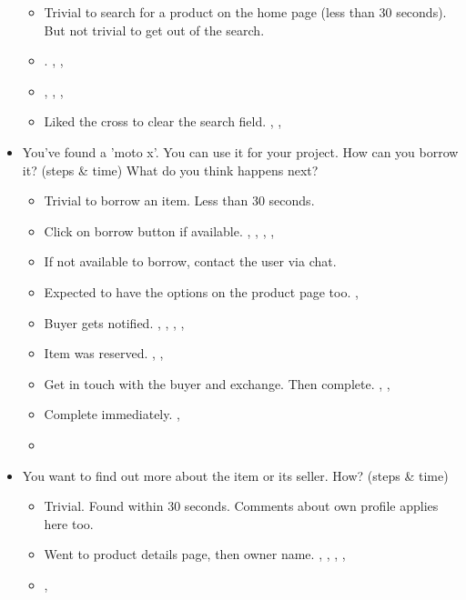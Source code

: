 \begin{itemize}
		\begin{itemize}
			\item Trivial to search for a product on the home page (less than 30 seconds). But not trivial to get out of the search.
			\item {}. , , 
			\item {} , , , 
			\item Liked the cross to clear the search field. , , 
		\end{itemize}
		\tab
	\item You've found a 'moto x'. You can use it for your project. How can you borrow it? (steps \& time) What do you think happens next?
		\begin{itemize}
			\item Trivial to borrow an item. Less than 30 seconds.
			\item Click on borrow button if available. , , , , 
			\item If not available to borrow, contact the user via chat. 
			\item Expected to have the options on the product page too. , 
			\item Buyer gets notified. , , , , 
			\item Item was reserved. , , 
			\item Get in touch with the buyer and exchange. Then complete. , , 
			\item Complete immediately. , 
			\item {} 
		\end{itemize}
		\tab
	\item You want to find out more about the item or its seller. How? (steps \& time)
		\begin{itemize}
			\item Trivial. Found within 30 seconds. Comments about own profile applies here too.
			\item Went to product details page, then owner name. , , , , 
			\item {} , 

\end{itemize}
\end{itemize}
